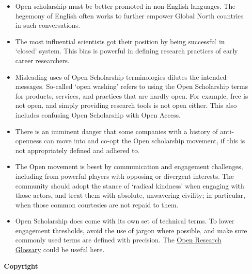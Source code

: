 \begin{itemize}
\item
  Open scholarship must be better promoted in non-English languages. The
  hegemony of English often works to further empower Global North
  countries in such conversations.
\item
  The most influential scientists got their position by being successful
  in `closed' system. This bias is powerful in defining research
  practices of early career researchers.
\item
  Misleading uses of Open Scholarship terminologies dilutes the intended
  messages. So-called `open washing' refers to using the Open
  Scholarship terms for products, services, and practices that are
  hardly open. For example, free is not open, and simply providing
  research tools is not open either. This also includes confusing Open
  Scholarship with Open Access.
\item
  There is an imminent danger that some companies with a history of
  anti-openness can move into and co-opt the Open scholarship movement,
  if this is not appropriately defined and adhered to.
\item
  The Open movement is beset by communication and engagement challenges,
  including from powerful players with opposing or divergent interests.
  The community should adopt the stance of `radical kindness' when
  engaging with those actors, and treat them with absolute, unwavering
  civility; in particular, when those common courtesies are not repaid
  to them.
\item
  Open Scholarship does come with its own set of technical terms. To
  lower engagement thresholds, avoid the use of jargon where possible,
  and make sure commonly used terms are defined with precision. The
  \href{https://openresearchglossary.herokuapp.com/}{Open Research
  Glossary} could be useful here.
\end{itemize}

\textbf{Copyright}

